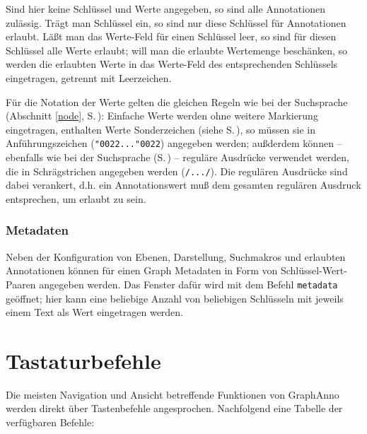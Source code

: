 \documentclass[12pt]{scrartcl}
\newcommand{\quo}{\char"0022}
\begin{document}
Sind hier keine Schlüssel und Werte angegeben, so sind alle Annotationen zulässig. Trägt man Schlüssel ein, so sind nur diese Schlüssel für Annotationen erlaubt. Läßt man das Werte-Feld für einen Schlüssel leer, so sind für diesen Schlüssel alle Werte erlaubt; will man die erlaubte Wertemenge beschänken, so werden die erlaubten Werte in das Werte-Feld des entsprechenden Schlüssels eingetragen, getrennt mit Leerzeichen.

Für die Notation der Werte gelten die gleichen Regeln wie bei der Suchsprache (Abschnitt \ref{node}, S.\,\pageref{zeichenketten}): Einfache Werte werden ohne weitere Markierung eingetragen, enthalten Werte Sonderzeichen (siehe S.\,\pageref{zeichenketten}), so müssen sie in Anführungszeichen (\texttt{\quo...\quo}) angegeben werden; außderdem können – ebenfalls wie bei der Suchsprache (S.\,\pageref{zeichenketten}) – reguläre Ausdrücke verwendet werden, die in Schrägstrichen angegeben werden (\texttt{/.../}). Die regulären Ausdrücke sind dabei verankert, d.h. ein Annotationswert muß dem gesamten regulären Ausdruck entsprechen, um erlaubt zu sein.

\subsubsection{Metadaten}

Neben der Konfiguration von Ebenen, Darstellung, Suchmakros und erlaubten Annotationen können für einen Graph Metadaten in Form von Schlüssel-Wert-Paaren angegeben werden. Das Fenster dafür wird mit dem Befehl \texttt{metadata} geöffnet; hier kann eine beliebige Anzahl von beliebigen Schlüsseln mit jeweils einem Text als Wert eingetragen werden.



\section{Tastaturbefehle}

Die meisten Navigation und Ansicht betreffende Funktionen von GraphAnno werden direkt über Tastenbefehle angesprochen. Nachfolgend eine Tabelle der verfügbaren Befehle:
\end{document}
